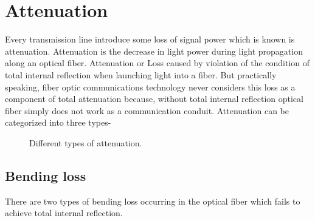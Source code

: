 \documentclass[12pt]{report}
\begin{document}
	
	\section{Attenuation}
	Every transmission line introduce some loss of signal power which is known is attenuation. Attenuation is the decrease in light power during light propagation along an optical fiber. Attenuation or Loss caused by violation of the condition of total internal reflection when launching light into a fiber. But practically speaking, fiber optic communications technology never considers this loss as a component of total attenuation because, without total internal reflection optical fiber simply does not work as a communication conduit. Attenuation can be categorized into three types- 
	\begin{figure}[htbp]
		\caption{Different types of attenuation.}
		\label{fig:attenuation}
	\end{figure}
	\subsection{Bending loss}
	There are two types of bending loss occurring in the optical fiber which fails to achieve total internal reflection. 
	
\end{document}
